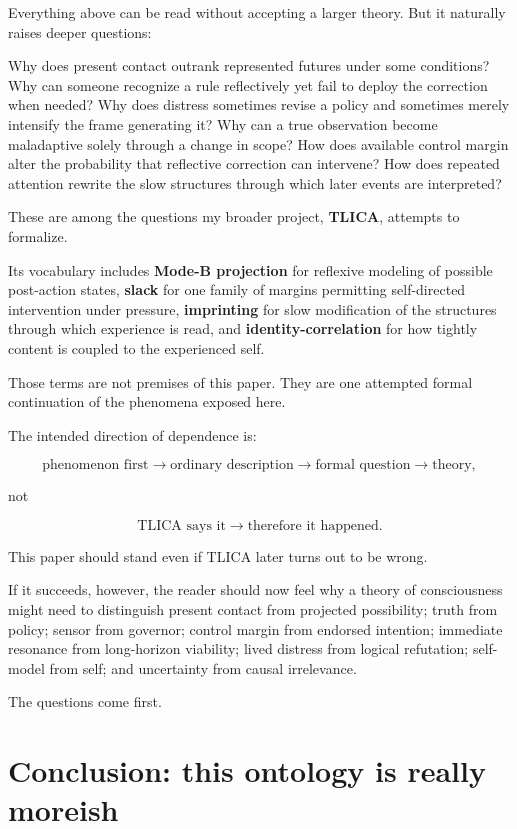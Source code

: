 \documentclass[10pt,letterpaper]{article}
\newenvironment{paperbody}
  {\begingroup\justifying}
  {\par\endgroup}
\let\oldsection\section
\renewcommand{\section}{\Needspace{6\baselineskip}\oldsection}
\begin{document}
\begin{paperbody}
Everything above can be read without accepting a larger theory. But it
naturally raises deeper questions:

Why does present contact outrank represented futures under some
conditions? Why can someone recognize a rule reflectively yet fail to
deploy the correction when needed? Why does distress sometimes revise a
policy and sometimes merely intensify the frame generating it? Why can a
true observation become maladaptive solely through a change in scope?
How does available control margin alter the probability that reflective
correction can intervene? How does repeated attention rewrite the slow
structures through which later events are interpreted?

These are among the questions my broader project, \textbf{TLICA},
attempts to formalize.

Its vocabulary includes \textbf{Mode-B projection} for reflexive
modeling of possible post-action states, \textbf{slack} for one family
of margins permitting self-directed intervention under pressure,
\textbf{imprinting} for slow modification of the structures through
which experience is read, and \textbf{identity-correlation} for how
tightly content is coupled to the experienced self.

Those terms are not premises of this paper. They are one attempted
formal continuation of the phenomena exposed here.

The intended direction of dependence is:

\[
\text{phenomenon first}
\to
\text{ordinary description}
\to
\text{formal question}
\to
\text{theory},
\]

not

\[
\text{TLICA says it}
\to
\text{therefore it happened}.
\]

This paper should stand even if TLICA later turns out to be wrong.

If it succeeds, however, the reader should now feel why a theory of
consciousness might need to distinguish present contact from projected
possibility; truth from policy; sensor from governor; control margin
from endorsed intention; immediate resonance from long-horizon
viability; lived distress from logical refutation; self-model from self;
and uncertainty from causal irrelevance.

The questions come first.

\section{Conclusion: this ontology is really
moreish}\label{conclusion-this-ontology-is-really-moreish}


\end{paperbody}
\end{document}
